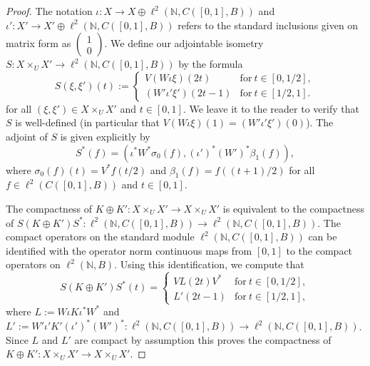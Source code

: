 \documentclass[pdftex]{sigma}
\numberwithin{equation}{section}
\newcommand{\op}{\oplus}
\newcommand{\ti}{\times}
\newcommand{\nn}{\mathbb{N}}
\newcommand{\be}{\beta}
\newcommand{\io}{\iota}
\newcommand{\si}{\sigma}
\begin{document}
\begin{proof}
The notation $\io\colon X \to X \op \ell^2(\nn,C([0,1],B))$ and $\io'\colon X' \to X' \op \ell^2(\nn,C([0,1],B))$ refers to the standard inclusions given on matrix form as $\left(\begin{smallmatrix} 1 \\ 0\end{smallmatrix}\right)$. We define our adjointable isometry $S\colon X \ti_U X' \to \ell^2( \nn, C([0,1],B))$ by the formula
\[
S(\xi,\xi')(t) := \begin{cases}
V( W \io \xi)(2t) & \text{for} \ t \in [0,1/2], \\ (W' \io' \xi')(2t - 1) & \text{for} \ t \in [1/2,1].\end{cases}
\]
for all $(\xi,\xi') \in X \ti_U X'$ and $t \in [0,1]$. We leave it to the reader to verify that $S$ is well-defined (in particular that $V(W \io \xi)(1) = (W' \io'\xi')(0)$). The adjoint of $S$ is given explicitly by
\[
S^*(f) = ( \io^* W^* \si_0(f), (\io')^* (W')^*\be_1(f)),
\]
where $\si_0(f)(t) = V^* f(t/2)$ and $\be_1(f) = f((t + 1)/2)$ for all $f \in \ell^2(C([0,1],B))$ and $t \in [0,1]$.

The compactness of $K \op K'\colon X \ti_U X' \to X \ti_U X'$ is equivalent to the compactness of $S (K \op K') S^*\colon \ell^2(\nn,C([0,1],B)) \to \ell^2(\nn,C([0,1],B))$. The compact operators on the standard module $\ell^2(\nn,C([0,1],B))$ can be identified with the operator norm continuous maps from $[0,1]$ to the compact operators on $\ell^2(\nn,B)$. Using this identification, we compute that
\[
S (K \op K') S^* (t) = \begin{cases} V L(2t) V^* & \text{for} \ t \in [0,1/2], \\ L'(2t - 1) & \text{for} \ t \in [1/2,1] ,\end{cases}
\]
where $L := W \io K \io^* W^*$ and $L' := W' \io' K' (\io')^* (W')^*\colon \ell^2(\nn,C([0,1],B)) \to \ell^2(\nn,C([0,1],B))$. Since $L$ and $L'$ are compact by assumption this proves the compactness of $K \op K'\colon X \ti_U X' \to X \ti_U X'$.
\end{proof}
\end{document}
